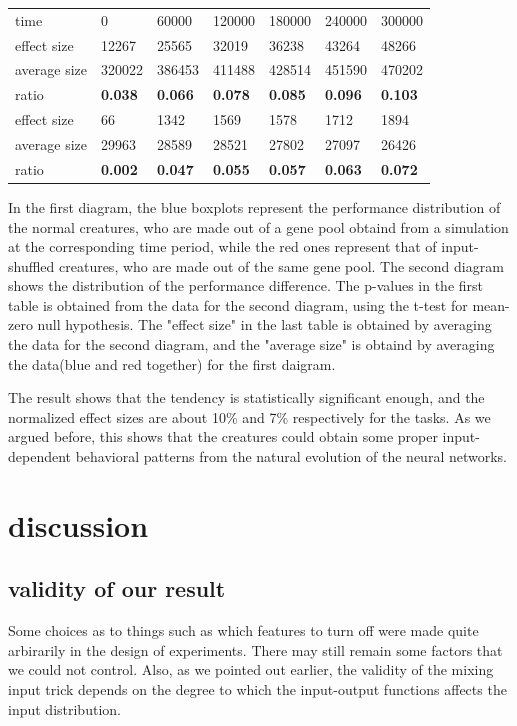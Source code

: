\documentclass{amsart}
\theoremstyle{definition}
\theoremstyle{remark}
\numberwithin{equation}{section}
\begin{document}
\begin{table}[htb]
\begin{tabular}{lllllll}
time & 0 & 60000 & 120000 & 180000&240000&300000 \\
effect size& 12267& 25565& 32019& 36238& 43264& 48266 \\
average size& 320022&386453&411488&428514&451590&470202\\
ratio& \bf{0.038}& \bf{0.066}& \bf{0.078}& \bf{0.085}& \bf{0.096}& \bf{0.103}\\
effect size& 66& 1342& 1569& 1578& 1712& 1894  \\
average size& 29963& 28589& 28521& 27802& 27097& 26426\\
ratio& \bf{0.002}& \bf{0.047}& \bf{0.055}& \bf{0.057}& \bf{0.063}& \bf{0.072}  
  
\end{tabular}
\end{table}
In the first diagram, the blue boxplots represent the performance distribution of the normal creatures, who are made out of a gene pool obtaind from a simulation at the corresponding time period, while the red ones represent that  of input-shuffled creatures, who are made out of the same gene pool. The second diagram shows the distribution of the performance difference. The p-values in the first table is obtained from the data for the second diagram, using the t-test for mean-zero null hypothesis. The "effect size" in the last table is obtained by averaging the data for the second diagram, and the "average size" is obtaind by averaging the data(blue and red together) for the first daigram. 
  
The result shows that the tendency is statistically significant enough,
and the normalized effect sizes are about 10\% and 7\% respectively for the tasks. 
As we argued before, this shows that the creatures could obtain some proper input-dependent behavioral patterns from the natural evolution of the neural networks. 


\section{discussion}
\subsection{validity of our result}
Some choices as to things such as which features to turn off were made quite arbirarily in the design of experiments. There may still remain some factors that we could not control. Also, as we pointed out earlier, the validity of the mixing input trick depends on the degree to which the input-output functions affects the input distribution. 
\end{document}
